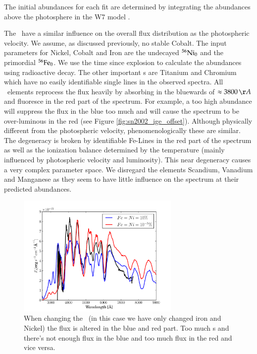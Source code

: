 The initial abundances for each fit are determined by integrating the abundances above the photosphere in the W7 model \citep{1984ApJ...286..644N}.

The \ige\ have a similar influence on the overall flux distribution as the photospheric velocity. 
We assume, as discussed previously, no stable Cobalt. The input parameters for Nickel, Cobalt and Iron are the undecayed $^{56}\textrm{Ni}_0$ and the primordial $^{56}\textrm{Fe}_0$. We use the time since explosion to calculate the abundances using radioactive decay. The other important \ige s are Titanium and Chromium which have no easily identifiable single lines in the observed spectra.  All \ige\ elements reprocess the flux heavily by absorbing in the bluewards of $\approx 3800\,\AA$ and fluoresce in the red part of the spectrum. For example, a too high abundance will suppress the flux in the blue too much and will cause the spectrum to be over-luminous in the red (see Figure \ref{fig:sn2002_ige_offset}). Although physically different from the photospheric velocity, phenomenologically these are similar. The degeneracy is broken by identifiable Fe-Lines in the red part of the spectrum as well as the ionization balance determined by the temperature (mainly influenced by photospheric velocity and luminosity). This near degeneracy causes a very complex parameter space. We disregard the elements Scandium, Vanadium and  Manganese as they seem to have little influence on the spectrum at their predicted abundances.

\begin{figure}[htbp] %
   \centering
   \includegraphics[width=0.7\textwidth]{chapter_dalek/plots/bf2002bo-10_ige.pdf} 
   \caption{When changing the \ige\ (in this case we have only changed iron and Nickel) the flux is altered in the blue and red part. Too much \ige s and there's not enough flux in the blue and too much flux in the red and vice versa.}
   \label{fig:sn2002bo_ige_offset}
\end{figure}

